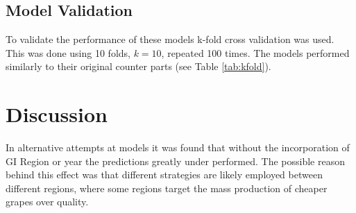 \documentclass[review,12pt,authoryear]{elsarticle}
\begin{document}
\begin{linenumbers}
\subsection{Model Validation}
\begin{table}[]
  \label{tab:kfold}
  \caption{Model validation using k-fold cross validation, for 10 folds repeated 100 times.}
  \end{table}
To validate the performance of these models k-fold cross validation was used. This was done using 10 folds, $k=10$, repeated 100 times. The models performed similarly to their original counter parts (see Table \ref{tab:kfold}).
\section{Discussion}
% 
%
%
In alternative attempts at models it was found that without the incorporation of GI Region or year the predictions greatly under performed. The possible reason behind this effect was that different strategies are likely employed between different regions, where some regions target the mass production of cheaper grapes over quality. %
%




\end{linenumbers}
\end{document}
